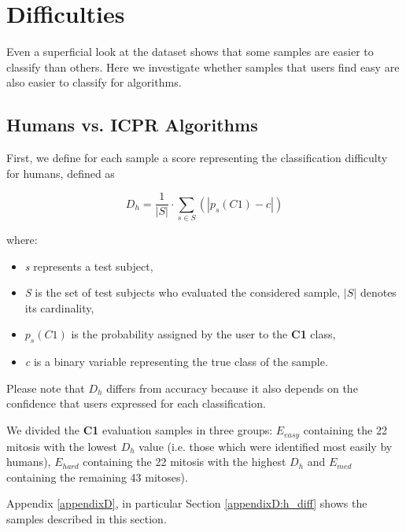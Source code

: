 \section{Difficulties}

Even a superficial look at the dataset shows that some samples are easier to classify than others.
Here we investigate whether samples that users find easy are also easier to classify for algorithms.

\vspace{0.5cm}

\subsection{Humans vs. ICPR Algorithms}

\label{ch6:diff1}

First, we define for each sample a score representing the classification difficulty for humans, defined as

\begin{equation}
 D_h = \frac{1}{|S|} \cdot \sum_{s \in S} \left(  |p_s(C1) - c |  \right)
 \label{ch6:eq2}
\end{equation}

\noindent where:

\begin{itemize}
 \item \textit{s} represents a test subject,
 \item \textit{S} is the set of test subjects who evaluated the considered sample, $|S|$ denotes its cardinality,
 \item $p_s(C1)$ is the probability assigned by the user to the \textbf{C1} class,
 \item \textit{c} is a binary variable representing the true class of the sample.
\end{itemize}

Please note that $D_h$ differs from accuracy because it also depends on the confidence that users expressed for each classification.

We divided the \textbf{C1} evaluation samples in three groups: $E_{easy}$ containing the 22 mitosis with the lowest $D_h$ value 
(i.e. those which were identified most easily by humans), $E_{hard}$ containing the 22 mitosis with the highest $D_h$  and $E_{med}$
containing the remaining 43 mitoses).

Appendix \ref{appendixD}, in particular Section \ref{appendixD:h_diff} shows the samples described in this section.


